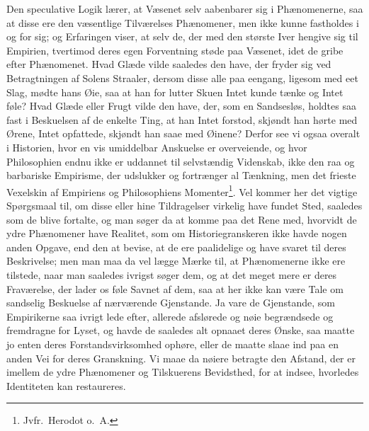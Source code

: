 \documentclass[12pt]{book}
\renewcommand{\thefootnote}{\arabic{footnote})}
\newcommand{\opage}[1]{\marginnote{\footnotesize\textit{[#1]}}}
\begin{document}
Den speculative Logik lærer, at Væsenet selv aabenbarer sig i Phænomenerne,
saa at disse ere den væsentlige Tilværelses Phænomener, men ikke kunne
fastholdes i og for sig; og Erfaringen viser, at selv de, der med den største
Iver hengive
\opage{12} \setcounter{footnote}{0}%
sig til Empirien, tvertimod deres egen Forventning støde paa Væsenet, idet de
gribe efter Phænomenet. Hvad Glæde vilde saaledes den have, der fryder sig ved
Betragtningen af Solens Straaler, dersom disse alle paa eengang, ligesom med
eet Slag, mødte hans Øie, saa at han for lutter Skuen Intet kunde tænke og
Intet føle? Hvad Glæde eller Frugt vilde den have, der, som en Sandsesløs,
holdtes saa fast i Beskuelsen af de enkelte Ting, at han Intet forstod,
skjøndt han hørte med Ørene, Intet opfattede, skjøndt han saae med Øinene?
Derfor see vi ogsaa overalt i Historien, hvor en vis umiddelbar Anskuelse er
overveiende, og hvor Philosophien endnu ikke er uddannet til selvstændig
Videnskab, ikke den raa og barbariske Empirisme, der udslukker og fortrænger
al Tænkning, men det frieste Vexelskin af Empiriens og Philosophiens
Momenter\footnote{Jvfr.\ Herodot o.\ A.}. Vel kommer her det vigtige
Spørgsmaal til, om disse eller hine Tildragelser virkelig have fundet Sted,
saaledes som de blive fortalte, og man søger da at komme paa det Rene med,
hvorvidt de ydre Phænomener have Realitet, som om Historiegranskeren ikke
havde nogen anden Opgave, end den at bevise, at de ere paalidelige og have
svaret til deres Beskrivelse; men man maa da vel lægge Mærke til, at
Phænomenerne ikke ere tilstede, naar man saaledes ivrigst søger dem, og at det
meget mere er deres Fraværelse, der lader os føle Savnet af dem, saa at her
ikke kan være Tale om sandselig Beskuelse af nærværende Gjenstande. Ja vare de
Gjenstande, som Empirikerne saa ivrigt lede efter, allerede afslørede og nøie
begrændsede og fremdragne for Lyset, og havde de saaledes alt opnaaet deres
Ønske, saa maatte jo enten deres Forstandsvirksomhed ophøre, eller de maatte
slaae ind paa en anden Vei for deres Granskning.
\opage{13} %
Vi maae da nøiere betragte den Afstand, der er imellem de ydre Phænomener og
Tilskuerens Bevidsthed, for at indsee, hvorledes Identiteten kan restaureres.
\end{document}
